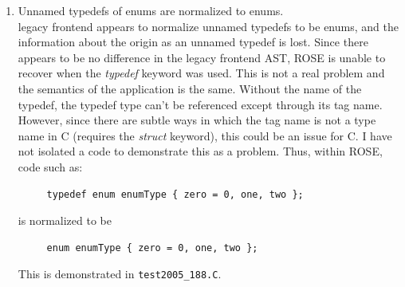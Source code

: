 \begin{enumerate}
       This problem could be fixed by computing a style alias table to permit the shortest
    type name to always be used.  Either that or we should explicitly store the lists of 
    qualified names and recompute them only where transformations have been
    done.


\item Unnamed typedefs of enums are normalized to enums. \\
     legacy frontend appears to normalize unnamed typedefs to be enums, and the information about the 
     origin as an unnamed typedef is lost.  Since there appears to be no difference in the
     legacy frontend AST, ROSE is unable to recover when the {\em typedef} keyword was used.  This is not
     a real problem and the semantics of the application is the same.  Without
     the name of the typedef, the typedef type can't be referenced except through its tag
     name.  However, since there are subtle ways in which the tag name is not a type name in
     C (requires the {\em struct} keyword), this could be an issue for C. I have not
     isolated a code to demonstrate this as a problem. Thus, within ROSE, code such as:
{\indent
{\mySmallFontSize
\begin{verbatim}
     typedef enum enumType { zero = 0, one, two };
\end{verbatim}
}}
     is normalized to be
{\indent
{\mySmallFontSize
\begin{verbatim}
     enum enumType { zero = 0, one, two };
\end{verbatim}
}}
     This is demonstrated in {\tt test2005\_188.C}.


\end{enumerate}
